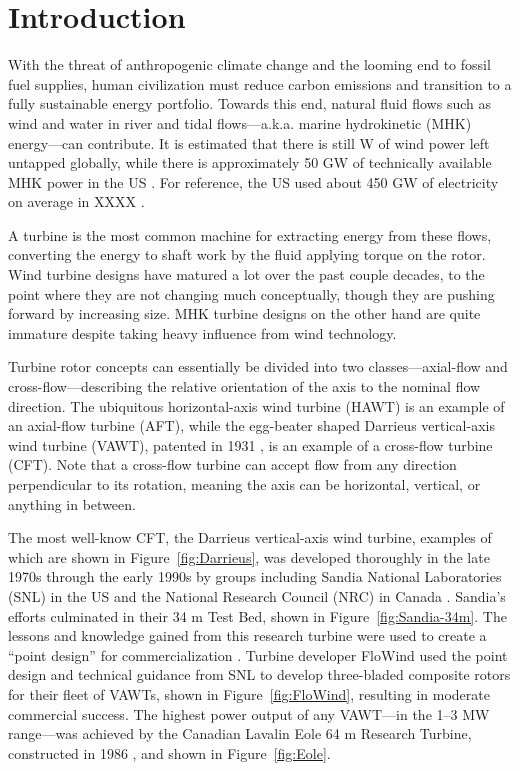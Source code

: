 \chapter{Introduction}

With the threat of anthropogenic climate change and the looming end to fossil
fuel supplies, human civilization must reduce carbon emissions \cite{Hansen2013}
and transition to a fully sustainable energy portfolio. Towards this end,
natural fluid flows such as wind and water in river and tidal flows---a.k.a.
marine hydrokinetic (MHK) energy---can contribute. It is estimated that there is
still  W of wind power
left untapped globally, while there is approximately 50 GW of technically
available MHK power in the US \cite{Haas2011, Jacobson2012, Haas2013}. For
reference, the US used about 450 GW of electricity on average in XXXX
.

A turbine is the most common machine for extracting energy from these flows,
converting the energy to shaft work by the fluid applying torque on the rotor.
Wind turbine designs have matured a lot over the past couple decades, to the
point where they are not changing much conceptually, though they are pushing
forward by increasing size. MHK turbine designs on the other hand are quite
immature despite taking heavy influence from wind technology.

Turbine rotor concepts can essentially be divided into two classes---axial-flow
and cross-flow---describing the relative orientation of the axis to the nominal
flow direction. The ubiquitous horizontal-axis wind turbine (HAWT) is an example
of an axial-flow turbine (AFT), while the egg-beater shaped Darrieus
vertical-axis wind turbine (VAWT), patented in 1931 \cite{Darrieus1931}, is an
example of a cross-flow turbine (CFT). Note that a cross-flow turbine can accept
flow from any direction perpendicular to its rotation, meaning the axis can be
horizontal, vertical, or anything in between.

The most well-know CFT, the Darrieus vertical-axis wind turbine, examples of
which are shown in Figure~\ref{fig:Darrieus}, was developed thoroughly in the
late 1970s through the early 1990s by groups including Sandia National
Laboratories (SNL) in the US and the National Research Council (NRC) in Canada
\cite{Para2002}. Sandia's efforts culminated in their 34 m Test Bed, shown in
Figure~\ref{fig:Sandia-34m}. The lessons and knowledge gained from this research
turbine were used to create a ``point design'' for commercialization
\cite{Sutherland2012}. Turbine developer FloWind used the point design and
technical guidance from SNL to develop three-bladed composite rotors for their
fleet of VAWTs, shown in Figure~\ref{fig:FloWind}, resulting in moderate
commercial success. The highest power output of any VAWT---in the 1--3 MW
range---was achieved by the Canadian Lavalin Eole 64 m Research Turbine,
constructed in 1986 \cite{Para2002}, and shown in Figure~\ref{fig:Eole}.

